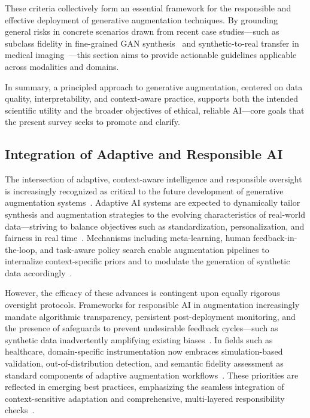 \documentclass[sigconf]{acmart}
\begin{document}
These criteria collectively form an essential framework for the responsible and effective deployment of generative augmentation techniques. By grounding general risks in concrete scenarios drawn from recent case studies—such as subclass fidelity in fine-grained GAN synthesis~\cite{ref101} and synthetic-to-real transfer in medical imaging~\cite{ref81}—this section aims to provide actionable guidelines applicable across modalities and domains. 

In summary, a principled approach to generative augmentation, centered on data quality, interpretability, and context-aware practice, supports both the intended scientific utility and the broader objectives of ethical, reliable AI—core goals that the present survey seeks to promote and clarify.

\subsection{Integration of Adaptive and Responsible AI}

The intersection of adaptive, context-aware intelligence and responsible oversight is increasingly recognized as critical to the future development of generative augmentation systems~\cite{ref91,ref92,ref93,ref94,ref95}. Adaptive AI systems are expected to dynamically tailor synthesis and augmentation strategies to the evolving characteristics of real-world data---striving to balance objectives such as standardization, personalization, and fairness in real time~\cite{ref91,ref93}. Mechanisms including meta-learning, human feedback-in-the-loop, and task-aware policy search enable augmentation pipelines to internalize context-specific priors and to modulate the generation of synthetic data accordingly~\cite{ref91,ref92,ref93}.

However, the efficacy of these advances is contingent upon equally rigorous oversight protocols. Frameworks for responsible AI in augmentation increasingly mandate algorithmic transparency, persistent post-deployment monitoring, and the presence of safeguards to prevent undesirable feedback cycles---such as synthetic data inadvertently amplifying existing biases~\cite{ref94,ref95,ref101}. In fields such as healthcare, domain-specific instrumentation now embraces simulation-based validation, out-of-distribution detection, and semantic fidelity assessment as standard components of adaptive augmentation workflows~\cite{ref87,ref101}. These priorities are reflected in emerging best practices, emphasizing the seamless integration of context-sensitive adaptation and comprehensive, multi-layered responsibility checks~\cite{ref94,ref95,ref101}.
\end{document}

